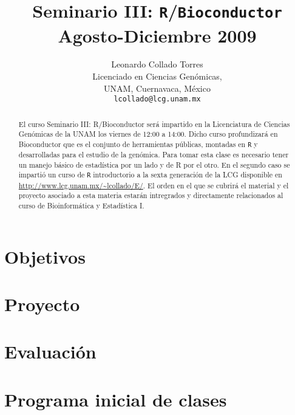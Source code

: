 \documentclass[letterpaper,12pt]{article}
\title{\textbf{Seminario III: \texttt{R}/\texttt{Bioconductor}\\Agosto-Diciembre 2009}}
\author{Leonardo Collado Torres\\[1em]Licenciado en Ciencias Genómicas,\\ UNAM, Cuernavaca, México\\[1em]\texttt{lcollado@lcg.unam.mx}}
\begin{document}
\maketitle

\medskip
{}

\medskip
\begin{abstract}
El curso Seminario III: R/Bioconductor será impartido en la Licenciatura de Ciencias Genómicas de la UNAM los viernes de 12:00 a 14:00. Dicho curso profundizará en Bioconductor que es el conjunto de herramientas públicas, montadas en \texttt{R} y desarrolladas para el estudio de la genómica. Para tomar esta clase es necesario tener un manejo básico de estadística por un lado y de R por el otro. En el segundo caso se impartió un curso de \texttt{R} introductorio a la sexta generación de la LCG disponible en \url{http://www.lcg.unam.mx/~lcollado/E/}. El orden en el que se cubrirá el material y el proyecto asociado a esta materia estarán intregrados y directamente relacionados al curso de Bioinformática y Estadística I. 
\end{abstract}

\section{Objetivos}

\section{Proyecto}

\section{Evaluación}

\section{Programa inicial de clases}
\end{document}
